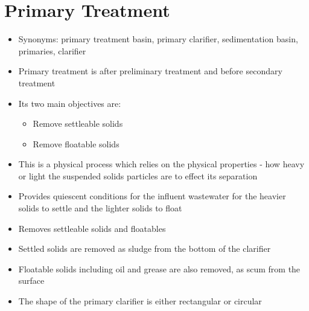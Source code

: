 \documentclass{article}
\begin{document}
\section{Primary Treatment}	

\begin{itemize}
\item Synonyms:  primary treatment basin, primary clarifier, sedimentation basin, primaries, clarifier

	
		\item Primary treatment is after preliminary treatment and 				before secondary treatment
		\item Its two main objectives are: 
			\begin{itemize}
				\item Remove settleable solids
				\item Remove floatable solids
			\end{itemize}
		\item This is a physical process which relies on the physical 			properties - how heavy or light the suspended solids particles 		are to effect its separation
		\item Provides quiescent conditions for the influent 					wastewater for the heavier solids to settle and the lighter 			solids to float
		\item Removes settleable solids and floatables
		\item Settled solids are removed as sludge from the bottom of 			the clarifier
		\item Floatable solids including oil and grease are also 				removed, as scum from the surface\\
		\item The shape of the primary clarifier is either rectangular 		or circular
	

\end{itemize}
\end{document}
